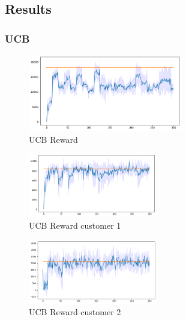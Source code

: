 

\subsection{Results}
\subsubsection{UCB}
\begin{figure}[ht]
    \begin{center}
    \includegraphics[width=0.6\textwidth]{img/ucb7.png}
    \caption{UCB Reward}
    \label{fig:reward7}
    \end{center}
\end{figure}
\begin{multicols}{2}
    \begin{figure}[H]
        \begin{center}
        \includegraphics[width=0.5\textwidth]{img/ucb7_1.png}
        \caption{UCB Reward customer 1}
        \label{fig:reward71}
        \end{center}
    \end{figure}
    \columnbreak
    \begin{figure}[H]
        \begin{center}
        \includegraphics[width=0.5\textwidth]{img/ucb7_2.png}
        \caption{UCB Reward customer 2}
        \label{fig:reward72}
        \end{center}
    \end{figure}
\end{multicols}
